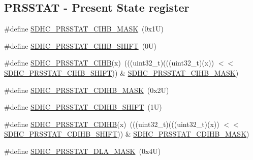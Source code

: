 \subsection*{P\+R\+S\+S\+T\+AT -\/ Present State register}
\begin{DoxyCompactItemize}
\item 
\#define \mbox{\hyperlink{group___s_d_h_c___register___masks_gaaba7df21329c057fa8906bcdffefb948}{S\+D\+H\+C\+\_\+\+P\+R\+S\+S\+T\+A\+T\+\_\+\+C\+I\+H\+B\+\_\+\+M\+A\+SK}}~(0x1\+U)
\item 
\#define \mbox{\hyperlink{group___s_d_h_c___register___masks_ga104678507322e6937284cec9aabbe2ff}{S\+D\+H\+C\+\_\+\+P\+R\+S\+S\+T\+A\+T\+\_\+\+C\+I\+H\+B\+\_\+\+S\+H\+I\+FT}}~(0\+U)
\item 
\#define \mbox{\hyperlink{group___s_d_h_c___register___masks_ga09b01ab15d25c3ab52be568abe116370}{S\+D\+H\+C\+\_\+\+P\+R\+S\+S\+T\+A\+T\+\_\+\+C\+I\+HB}}(x)~(((uint32\+\_\+t)(((uint32\+\_\+t)(x)) $<$$<$ \mbox{\hyperlink{group___s_d_h_c___register___masks_ga104678507322e6937284cec9aabbe2ff}{S\+D\+H\+C\+\_\+\+P\+R\+S\+S\+T\+A\+T\+\_\+\+C\+I\+H\+B\+\_\+\+S\+H\+I\+FT}})) \& \mbox{\hyperlink{group___s_d_h_c___register___masks_gaaba7df21329c057fa8906bcdffefb948}{S\+D\+H\+C\+\_\+\+P\+R\+S\+S\+T\+A\+T\+\_\+\+C\+I\+H\+B\+\_\+\+M\+A\+SK}})
\item 
\#define \mbox{\hyperlink{group___s_d_h_c___register___masks_ga41cd86790ec73a0f81fe4910f8e6b379}{S\+D\+H\+C\+\_\+\+P\+R\+S\+S\+T\+A\+T\+\_\+\+C\+D\+I\+H\+B\+\_\+\+M\+A\+SK}}~(0x2\+U)
\item 
\#define \mbox{\hyperlink{group___s_d_h_c___register___masks_gaebffc8f5a96e2405094e614d8ab72bc2}{S\+D\+H\+C\+\_\+\+P\+R\+S\+S\+T\+A\+T\+\_\+\+C\+D\+I\+H\+B\+\_\+\+S\+H\+I\+FT}}~(1\+U)
\item 
\#define \mbox{\hyperlink{group___s_d_h_c___register___masks_ga18a640ee3b808bfcf5af7234642980cb}{S\+D\+H\+C\+\_\+\+P\+R\+S\+S\+T\+A\+T\+\_\+\+C\+D\+I\+HB}}(x)~(((uint32\+\_\+t)(((uint32\+\_\+t)(x)) $<$$<$ \mbox{\hyperlink{group___s_d_h_c___register___masks_gaebffc8f5a96e2405094e614d8ab72bc2}{S\+D\+H\+C\+\_\+\+P\+R\+S\+S\+T\+A\+T\+\_\+\+C\+D\+I\+H\+B\+\_\+\+S\+H\+I\+FT}})) \& \mbox{\hyperlink{group___s_d_h_c___register___masks_ga41cd86790ec73a0f81fe4910f8e6b379}{S\+D\+H\+C\+\_\+\+P\+R\+S\+S\+T\+A\+T\+\_\+\+C\+D\+I\+H\+B\+\_\+\+M\+A\+SK}})
\item 
\#define \mbox{\hyperlink{group___s_d_h_c___register___masks_ga609f9258fa078236470445ebfcd2e9ac}{S\+D\+H\+C\+\_\+\+P\+R\+S\+S\+T\+A\+T\+\_\+\+D\+L\+A\+\_\+\+M\+A\+SK}}~(0x4\+U)
\item 

\end{DoxyCompactItemize}
